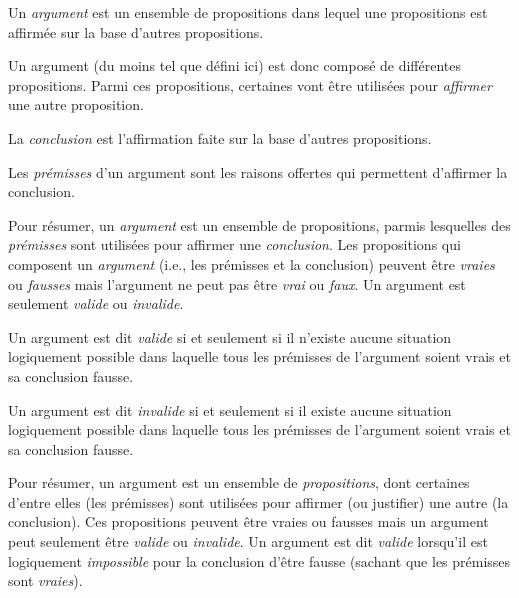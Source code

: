 \documentclass[
  a4paper,11pt,twoside,onecolumn,openright,final,oldfontcommands]{memoir}
\theoremstyle{definition}
\theoremstyle{definition}
\theoremstyle{definition}
\theoremstyle{remark}
\let\BeginKnitrBlock\begin \let\EndKnitrBlock\end
\begin{document}
\BeginKnitrBlock{definition}[Argument]
\protect\hypertarget{def:argument}{}{\label{def:argument} {} }Un \emph{argument} est un ensemble de propositions dans lequel une propositions est affirmée sur la base d'autres propositions.
\EndKnitrBlock{definition}

Un argument (du moins tel que défini ici) est donc composé de différentes propositions. Parmi ces propositions, certaines vont être utilisées pour \emph{affirmer} une autre proposition.

\BeginKnitrBlock{definition}[Conclusion]
\protect\hypertarget{def:concusion}{}{\label{def:concusion} {} }La \emph{conclusion} est l'affirmation faite sur la base d'autres propositions.
\EndKnitrBlock{definition}

\BeginKnitrBlock{definition}[Prémisses]
\protect\hypertarget{def:pruxe9misse}{}{\label{def:prémisse} {} }Les \emph{prémisses} d'un argument sont les raisons offertes qui permettent d'affirmer la conclusion.
\EndKnitrBlock{definition}

Pour résumer, un \emph{argument} est un ensemble de propositions, parmis lesquelles des \emph{prémisses} sont utilisées pour affirmer une \emph{conclusion}. Les propositions qui composent un \emph{argument} (i.e., les prémisses et la conclusion) peuvent être \emph{vraies} ou \emph{fausses} mais l'argument ne peut pas être \emph{vrai} ou \emph{faux}. Un argument est seulement \emph{valide} ou \emph{invalide}.

\BeginKnitrBlock{definition}[Validité]
\protect\hypertarget{def:valide}{}{\label{def:valide} {} }Un argument est dit \emph{valide} si et seulement si il n'existe aucune situation logiquement possible dans laquelle tous les prémisses de l'argument soient vrais et sa conclusion fausse.
\EndKnitrBlock{definition}

\BeginKnitrBlock{definition}[Invalidité]
\protect\hypertarget{def:invalide}{}{\label{def:invalide} {} }Un argument est dit \emph{invalide} si et seulement si il existe aucune situation logiquement possible dans laquelle tous les prémisses de l'argument soient vrais et sa conclusion fausse.
\EndKnitrBlock{definition}

Pour résumer, un argument est un ensemble de \emph{propositions}, dont certaines d'entre elles (les prémisses) sont utilisées pour affirmer (ou justifier) une autre (la conclusion). Ces propositions peuvent être vraies ou fausses mais un argument peut seulement être \emph{valide} ou \emph{invalide}. Un argument est dit \emph{valide} lorsqu'il est logiquement \emph{impossible} pour la conclusion d'être fausse (sachant que les prémisses sont \emph{vraies}).
\end{document}
